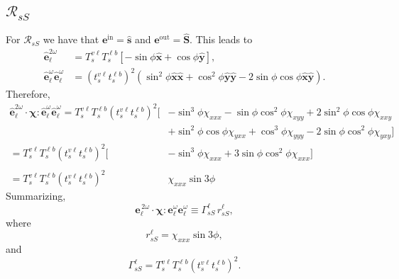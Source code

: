 \subsection{\texorpdfstring{$\mathcal{R}_{sS}$}{RsS}}

For $\mathcal{R}_{sS}$ we have that
$\mathbf{e}^{\mathrm{in}}=\hat{\mathbf{s}}$ and
$\mathbf{e}^{\mathrm{out}}=\hat{\mathbf{S}}$. This leads to
\begin{align*}
\hat{\mathbf{e}}^{2\omega}_{\ell} 
&= T^{v\ell}_{s}T^{\ell b}_{s}
\left[-\sin\phi\hat{\mathbf{x}} + \cos\phi\hat{\mathbf{y}}\right],\\
\hat{\mathbf{e}}^{\omega}_{\ell}\hat{\mathbf{e}}^{\omega}_{\ell}
&= \left(t^{v\ell}_{s}t^{\ell b}_{s}\right)^{2}
\left(
  \sin^{2}\phi\hat{\mathbf{x}}\hat{\mathbf{x}}
+ \cos^{2}\phi\hat{\mathbf{y}}\hat{\mathbf{y}} 
- 2\sin\phi\cos\phi\hat{\mathbf{x}}\hat{\mathbf{y}}
\right).
\end{align*}
Therefore,
\begin{equation*}
\begin{split}
\hat{\mathbf{e}}^{2\omega}_{\ell}
\cdot\boldsymbol{\chi}:
\hat{\mathbf{e}}^{\omega}_{\ell}\hat{\mathbf{e}}^{\omega}_{\ell} =
T^{v\ell}_{s}T^{\ell b}_{s}\left(t^{v\ell}_{s}t^{\ell b}_{s}\right)^{2}
\big[&
-  \sin^{3}\phi\chi_{xxx}
-  \sin\phi\cos^{2}\phi\chi_{xyy}
+ 2\sin^{2}\phi\cos\phi\chi_{xxy}\\
&+ \sin^{2}\phi\cos\phi\chi_{yxx}
+  \cos^{3}\phi\chi_{yyy}
- 2\sin\phi\cos^{2}\phi\chi_{yxy}
\big]\\
=
T^{v\ell}_{s}T^{\ell b}_{s}\left(t^{v\ell}_{s}t^{\ell b}_{s}\right)^{2}
\big[&
-  \sin^{3}\phi\chi_{xxx}
+ 3\sin\phi\cos^{2}\phi\chi_{xxx}
\big]\\\\
=T^{v\ell}_{s}T^{\ell b}_{s}\left(t^{v\ell}_{s}t^{\ell b}_{s}\right)^{2}
\,\,\,&\chi_{xxx}\sin3\phi
\end{split}
\end{equation*}
Summarizing,
\begin{equation*}
\mathbf{e}^{\,2\omega}_{\ell}\cdot
\boldsymbol{\chi}:\mathbf{e}^\omega_{\ell}\mathbf{e}^\omega_{\ell}
\equiv\Gamma^{\ell}_{sS}\, r^{\ell}_{sS},
\end{equation*}
where
\begin{equation*}
r^{\ell}_{sS} = \chi_{xxx}\sin3\phi,
\end{equation*}
and
\begin{equation*}
\Gamma^{\ell}_{sS}=
T^{v\ell}_{s}T^{\ell b}_{s}\left(t^{v\ell}_{s}t^{\ell b}_{s}\right)^{2}.
\end{equation*} 

